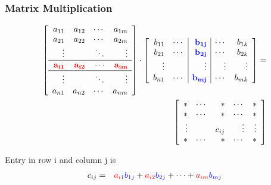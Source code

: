 \begin{frame}
  \frametitle{Matrix Multiplication}

  \begin{eqnarray*}
    \left[
    \begin{array}{rrrr}
      a_{11} & a_{12} & \cdots & a_{1m} \\
      a_{21} & a_{22} & \cdots & a_{2m} \\
      \vdots &       & \ddots & \vdots \\ \hline
      \color{red}{\mathbf{a_{i1}}} & \color{red}{\mathbf{a_{i2}}} & \color{red}{\mathbf{\cdots}} & \color{red}{\mathbf{a_{im}}} \\ \hline
      \vdots &       & \ddots & \vdots \\
      a_{n1} & a_{n2} & \cdots & a_{nm}
    \end{array}
  \right] \cdot
    \left[
    \begin{array}{rr|r|rr}
      b_{11}  & \cdots & \color{blue}{\mathbf{b_{1j}}} & \cdots  & b_{1k} \\
      b_{21}  & \cdots & \color{blue}{\mathbf{b_{2j}}} & \cdots  & b_{2k} \\
      \vdots &        & \vdots & \color{blue}{\mathbf{\vdots}} & \vdots \\
      b_{n1}  & \cdots & \color{blue}{\mathbf{b_{mj}}}  & \cdots & b_{mk}
    \end{array}
  \right]  =  \\
    \left[
    \begin{array}{rrrrr}
      * & \cdots & * & \cdots  &  * \\
      *  & \cdots & *  & \cdots  &  * \\
      \vdots &        & c_{ij} & \vdots & \vdots \\
      * & \cdots & *  & \cdots & *
    \end{array}
  \right]
  \end{eqnarray*}

  Entry in row i and column j is 
  \begin{eqnarray*}
    c_{ij} & = & {\color{red}a_{i1}}{\color{blue}b_{1j}} + {\color{red}a_{i2}}{\color{blue}b_{2j}} + \cdots + {\color{red}a_{im}}{\color{blue}b_{mj}}
  \end{eqnarray*}

\end{frame}


